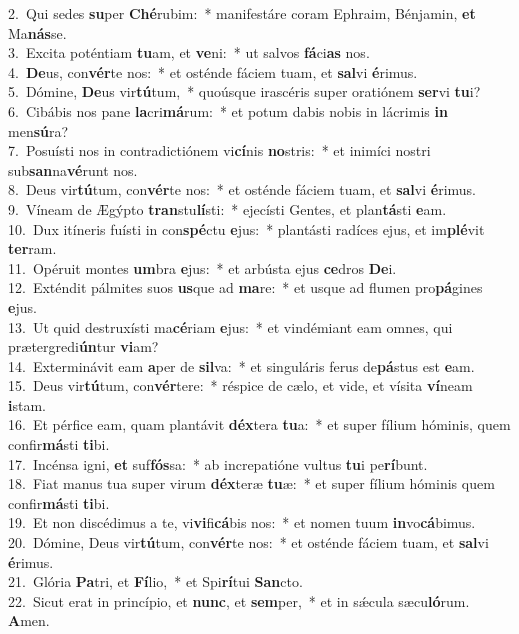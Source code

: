 {2.~}Qui sedes \textbf{su}per \textbf{Ché}rubim:~* manifestáre coram Ephraim, Bénjamin, \textbf{et} Ma\textbf{nás}se.\\
{3.~}Excita poténtiam \textbf{tu}am, et \textbf{ve}ni:~* ut salvos \textbf{fá}ci\textbf{as} nos.\\
{4.~}\textbf{De}us, con\textbf{vér}te nos:~* et osténde fáciem tuam, et \textbf{sal}vi \textbf{é}rimus.\\
{5.~}Dómine, \textbf{De}us vir\textbf{tú}tum,~* quoúsque irascéris super oratiónem \textbf{ser}vi \textbf{tu}i?\\
{6.~}Cibábis nos pane \textbf{la}cri\textbf{má}rum:~* et potum dabis nobis in lácrimis \textbf{in} men\textbf{sú}ra?\\
{7.~}Posuísti nos in contradictiónem vi\textbf{cí}nis \textbf{no}stris:~* et inimíci nostri sub\textbf{san}na\textbf{vé}runt nos.\\
{8.~}Deus vir\textbf{tú}tum, con\textbf{vér}te nos:~* et osténde fáciem tuam, et \textbf{sal}vi \textbf{é}rimus.\\
{9.~}Víneam de Ægýpto \textbf{tran}stu\textbf{lí}sti:~* ejecísti Gentes, et plan\textbf{tá}sti \textbf{e}am.\\
{10.~}Dux itíneris fuísti in con\textbf{spé}ctu \textbf{e}jus:~* plantásti radíces ejus, et im\textbf{plé}vit \textbf{ter}ram.\\
{11.~}Opéruit montes \textbf{um}bra \textbf{e}jus:~* et arbústa ejus \textbf{ce}dros \textbf{De}i.\\
{12.~}Exténdit pálmites suos \textbf{us}que ad \textbf{ma}re:~* et usque ad flumen pro\textbf{pá}gines \textbf{e}jus.\\
{13.~}Ut quid destruxísti ma\textbf{cé}riam \textbf{e}jus:~* et vindémiant eam omnes, qui prætergredi\textbf{ún}tur \textbf{vi}am?\\
{14.~}Exterminávit eam \textbf{a}per de \textbf{sil}va:~* et singuláris ferus de\textbf{pá}stus est \textbf{e}am.\\
{15.~}Deus vir\textbf{tú}tum, con\textbf{vér}tere:~* réspice de cælo, et vide, et vísita \textbf{ví}neam \textbf{i}stam.\\
{16.~}Et pérfice eam, quam plantávit \textbf{déx}tera \textbf{tu}a:~* et super fílium hóminis, quem confir\textbf{má}sti \textbf{ti}bi.\\
{17.~}Incénsa igni, \textbf{et} suf\textbf{fós}sa:~* ab increpatióne vultus \textbf{tu}i pe\textbf{rí}bunt.\\
{18.~}Fiat manus tua super virum \textbf{déx}teræ \textbf{tu}æ:~* et super fílium hóminis quem confir\textbf{má}sti \textbf{ti}bi.\\
{19.~}Et non discédimus a te, vi\textbf{vi}fi\textbf{cá}bis nos:~* et nomen tuum \textbf{in}vo\textbf{cá}bimus.\\
{20.~}Dómine, Deus vir\textbf{tú}tum, con\textbf{vér}te nos:~* et osténde fáciem tuam, et \textbf{sal}vi \textbf{é}rimus.\\
{21.~}Glória \textbf{Pa}tri, et \textbf{Fí}lio,~* et Spi\textbf{rí}tui \textbf{San}cto.\\
{22.~}Sicut erat in princípio, et \textbf{nunc}, et \textbf{sem}per,~* et in sǽcula sæcu\textbf{ló}rum. \textbf{A}men.\\
